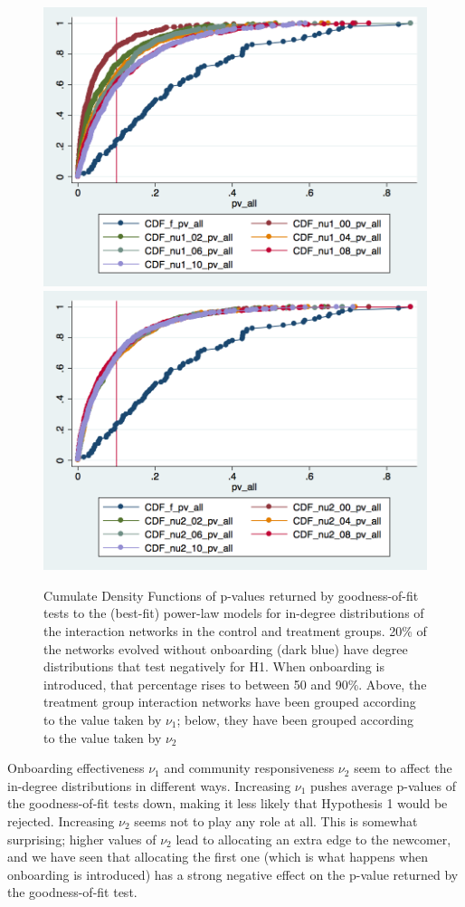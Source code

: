 \documentclass{nws}
\begin{document}
\begin{figure}[thb]
\centering

	\includegraphics[width=.75\linewidth]{./Pictures/CDF_pva_nu1.png}\label{fig:CDFnu_1}
	\includegraphics[width=.75\linewidth]{./Pictures/CDF_pva_nu2.png}\label{fig:CDFnu_2}
  \caption{Cumulate Density Functions of p-values returned by goodness-of-fit tests to the (best-fit) power-law models for in-degree distributions of the interaction networks in the control and treatment groups. 20\% of the networks evolved without onboarding (dark blue) have degree distributions that test negatively for H1. When onboarding is introduced, that percentage rises to between 50 and 90\%. Above, the treatment group interaction networks have been grouped according to the value taken by $\nu_1$; below, they have been grouped according to the value taken by $\nu_2$ } 
 \label{fig:CDFpvanu_1nu_2}
\end{figure}

Onboarding effectiveness $\nu_1$ and community responsiveness $\nu_2$ seem to affect the in-degree distributions in different ways. Increasing $\nu_1$ pushes average p-values of the goodness-of-fit tests down, making it less likely that Hypothesis 1 would be rejected. Increasing $\nu_2$ seems not to play any role at all. This is somewhat surprising; higher values of $\nu_2$ lead to allocating an extra edge to the newcomer, and we have seen that allocating the first one (which is what happens when onboarding is introduced) has a strong negative effect on the p-value returned by the goodness-of-fit test. 
\end{document}
